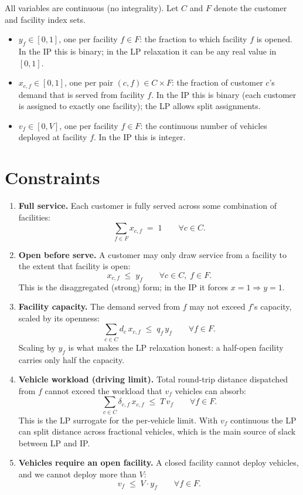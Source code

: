 \documentclass[11pt]{article}
\begin{document}
All variables are continuous (no integrality). Let $C$ and $F$ denote the
customer and facility index sets.

\begin{itemize}
  \item $y_f \in [0,1]$, one per facility $f \in F$: the fraction to which
        facility $f$ is opened. In the IP this is binary; in the LP
        relaxation it can be any real value in $[0,1]$.
  \item $x_{c,f} \in [0,1]$, one per pair $(c, f) \in C \times F$: the
        fraction of customer $c$'s demand that is served from facility $f$.
        In the IP this is binary (each customer is assigned to exactly one
        facility); the LP allows split assignments.
  \item $v_f \in [0, V]$, one per facility $f \in F$: the continuous number
        of vehicles deployed at facility $f$. In the IP this is integer.
\end{itemize}

\section{Constraints}
\label{s:constraints}

\begin{enumerate}
  \item \textbf{Full service.} Each customer is fully served across some
        combination of facilities:
        \[
          \sum_{f \in F} x_{c,f} \;=\; 1
          \qquad \forall c \in C.
        \]
  \item \textbf{Open before serve.} A customer may only draw service from a
        facility to the extent that facility is open:
        \[
          x_{c,f} \;\le\; y_f
          \qquad \forall c \in C,\; f \in F.
        \]
        This is the disaggregated (strong) form; in the IP it forces $x = 1
        \Rightarrow y = 1$.
  \item \textbf{Facility capacity.} The demand served from $f$ may not
        exceed $f$'s capacity, scaled by its openness:
        \[
          \sum_{c \in C} d_c\, x_{c,f} \;\le\; q_f\, y_f
          \qquad \forall f \in F.
        \]
        Scaling by $y_f$ is what makes the LP relaxation honest: a
        half-open facility carries only half the capacity.
  \item \textbf{Vehicle workload (driving limit).} Total round-trip
        distance dispatched from $f$ cannot exceed the workload that
        $v_f$ vehicles can absorb:
        \[
          \sum_{c \in C} \delta_{c,f}\, x_{c,f} \;\le\; T\, v_f
          \qquad \forall f \in F.
        \]
        This is the LP surrogate for the per-vehicle limit. With $v_f$
        continuous the LP can split distance across fractional vehicles,
        which is the main source of slack between LP and IP.
  \item \textbf{Vehicles require an open facility.} A closed facility
        cannot deploy vehicles, and we cannot deploy more than $V$:
        \[
          v_f \;\le\; V \cdot y_f
          \qquad \forall f \in F.
        \]
\end{enumerate}
\end{document}
